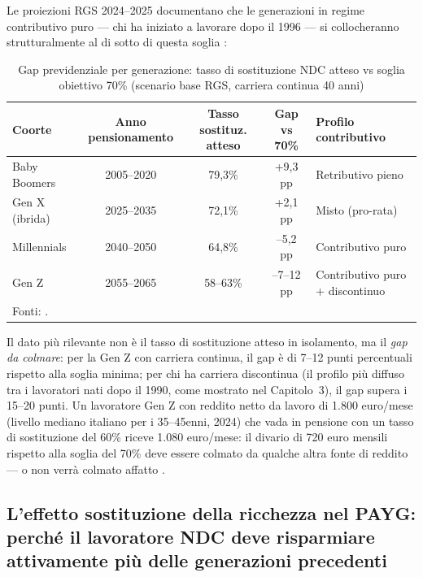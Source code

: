 \medskip
\noindent
Le proiezioni RGS 2024--2025 documentano che le generazioni in regime
contributivo puro — chi ha iniziato a lavorare dopo il 1996 —
si collocheranno strutturalmente al di sotto di questa soglia
\cite{MEFRGS2025}:

\begin{table}[h!]
\centering
\small
\caption{Gap previdenziale per generazione: tasso di sostituzione NDC atteso
         vs soglia obiettivo 70\% (scenario base RGS, carriera continua 40 anni)}
\label{tab:gap_prev}
\begin{tabular}{lcccl}
\toprule
\textbf{Coorte} & \textbf{Anno pensionamento} &
\textbf{Tasso sostituz. atteso} & \textbf{Gap vs 70\%}
& \textbf{Profilo contributivo} \\
\midrule
Baby Boomers    & 2005--2020 & 79,3\%  & +9,3 pp  & Retributivo pieno \\
Gen X (ibrida)  & 2025--2035 & 72,1\%  & +2,1 pp  & Misto (pro-rata) \\
Millennials     & 2040--2050 & 64,8\%  & --5,2 pp & Contributivo puro \\
Gen Z           & 2055--2065 & 58--63\%& --7--12 pp& Contributivo puro + discontinuo \\
\bottomrule
\multicolumn{5}{l}{\small Fonti: \cite{MEFRGS2025, RosenGayerRapallini2023,
CensisConfcooperative2026}.}
\end{tabular}
\end{table}

\noindent
Il dato più rilevante non è il tasso di sostituzione atteso in isolamento,
ma il \emph{gap da colmare}: per la Gen Z con carriera continua, il gap
è di 7--12 punti percentuali rispetto alla soglia minima;
per chi ha carriera discontinua (il profilo più diffuso tra i lavoratori
nati dopo il 1990, come mostrato nel Capitolo~3), il gap supera i
15--20 punti.
Un lavoratore Gen Z con reddito netto da lavoro di 1.800 euro/mese
(livello mediano italiano per i 35--45enni, 2024) che vada in pensione
con un tasso di sostituzione del 60\% riceve 1.080 euro/mese:
il divario di 720 euro mensili rispetto alla soglia del 70\%
deve essere colmato da qualche altra fonte di reddito —
o non verrà colmato affatto \cite{MEFRGS2025, Bosi2018}.

\subsection{L'effetto sostituzione della ricchezza nel PAYG:
            perché il lavoratore NDC deve risparmiare
            attivamente più delle generazioni precedenti}
\label{sub:effetto_sostituzione}

